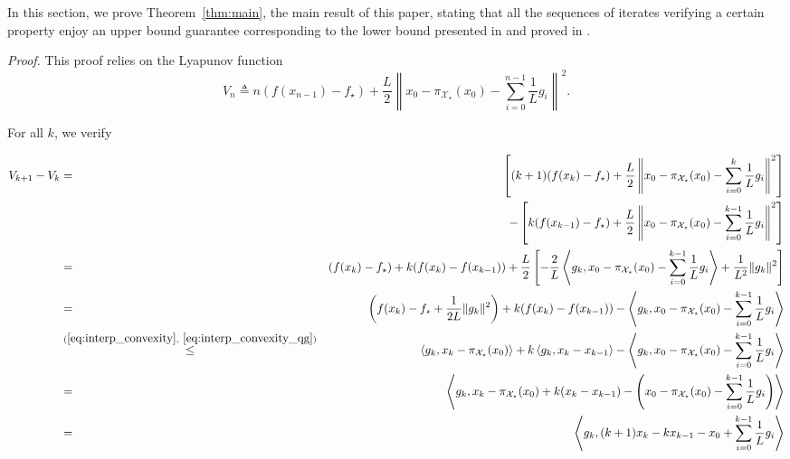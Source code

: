    In this section, we prove Theorem~\ref{thm:main}, the main result of this paper, stating that all the sequences of iterates verifying a certain property enjoy an upper bound guarantee corresponding to the lower bound presented in  and proved in .
    
    \mainresult*
    
    \noindent \textit{Proof.}
        This proof relies on the Lyapunov function
        \begin{equation}
            V_n \triangleq n(f(x_{n-1}) - f_\star) + \frac{L}{2} \left\| x_0 - \pi_{\mathcal{X_\star}}(x_0) - \sum_{i=0}^{n-1}\frac{1}{L}g_i \right\|^2.
        \end{equation}
        
        For all $k$, we verify
        
        \begin{eqnarray*}
            V_{k+1} - V_k & = & \left[(k+1)(f(x_{k}) - f_\star) + \frac{L}{2} \left\| x_0 - \pi_{\mathcal{X_\star}}(x_0) - \sum_{i=0}^{k}\frac{1}{L}g_i \right\|^2 \right] \\
            & & - \left[k(f(x_{k-1}) - f_\star) + \frac{L}{2} \left\| x_0 - \pi_{\mathcal{X_\star}}(x_0) - \sum_{i=0}^{k-1}\frac{1}{L} g_i \right\|^2 \right] \\
            & = & (f(x_k) - f_\star) + k(f(x_k) - f(x_{k-1})) + \frac{L}{2} \left[ -\frac{2}{L} \left< g_k , x_0 - \pi_{\mathcal{X_\star}}(x_0) - \sum_{i=0}^{k-1}\frac{1}{L} g_i \right> + \frac{1}{L^2} \|g_k\|^2 \right] \\
            & = & \left(f(x_k) - f_\star + \frac{1}{2L} \|g_k\|^2\right) + k(f(x_k) - f(x_{k-1})) - \left< g_k , x_0 - \pi_{\mathcal{X_\star}}(x_0) - \sum_{i=0}^{k-1}\frac{1}{L} g_i \right> \\
            & \overset{(\ref{eq:interp_convexity},~\ref{eq:interp_convexity_qg})}{\leq} & \left< g_k , x_k - \pi_{\mathcal{X_\star}}(x_0) \right> + k\left< g_k , x_k - x_{k-1} \right> - \left< g_k , x_0 - \pi_{\mathcal{X_\star}}(x_0) - \sum_{i=0}^{k-1}\frac{1}{L} g_i \right> \\
            & = & \left< g_k , x_k - \pi_{\mathcal{X_\star}}(x_0) + k(x_k - x_{k-1}) - \left( x_0 - \pi_{\mathcal{X_\star}}(x_0) - \sum_{i=0}^{k-1}\frac{1}{L} g_i \right) \right> \\
            & = & \left< g_k , (k+1) x_k - k x_{k-1} - x_0 + \sum_{i=0}^{k-1}\frac{1}{L} g_i \right>
        \end{eqnarray*}
        
